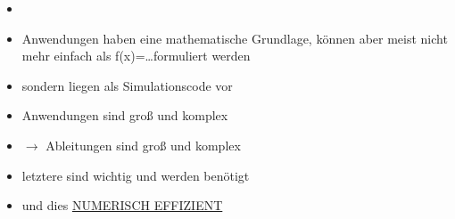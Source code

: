 \begin{itemize}
	\item
	
	\item Anwendungen haben eine mathematische Grundlage, können aber meist nicht mehr einfach als f(x)=\dots formuliert werden
	\item sondern liegen als Simulationscode vor
	\item Anwendungen sind groß und komplex
	\item $\rightarrow$ Ableitungen sind groß und komplex
	\item letztere sind wichtig und werden benötigt
	\item und dies \underline{NUMERISCH EFFIZIENT}
\end{itemize}